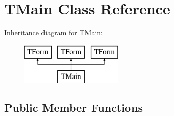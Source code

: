 \hypertarget{class_t_main}{}\section{T\+Main Class Reference}
\label{class_t_main}
Inheritance diagram for T\+Main\+:\begin{figure}[H]
\begin{center}
\leavevmode
\includegraphics[height=2.000000cm]{class_t_main}
\end{center}
\end{figure}
\subsection*{Public Member Functions}
